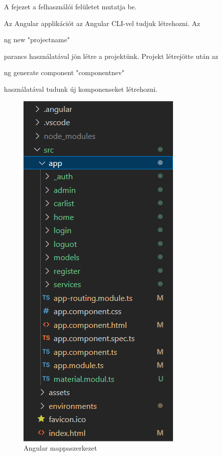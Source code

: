 
A fejezet a felhasználói felületet mutatja be.

Az Angular applikációt az Angular CLI-vel tudjuk létrehozni. Az
\begin{java}
ng new "projectname"
\end{java} 
parancs használatával jön létre a projektünk. Projekt létrejötte után az
\begin{java}
ng generate component "componentnev"
\end{java}
 használatával tudunk új komponenseket létrehozni.

\begin{figure}[h]
\centering
\includegraphics[scale=0.6]{images/angular_mappaszerkezet.png}
\caption{Angular mappaszerkezet}
\label{fig:mappaszerkezet}
\end{figure}
\newpage

